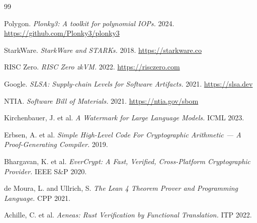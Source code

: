 \documentclass[11pt,a4paper]{article}
\begin{document}

\begin{thebibliography}{99}

 Polygon. \textit{Plonky3: A toolkit for polynomial IOPs.} 2024. \url{https://github.com/Plonky3/plonky3}

 StarkWare. \textit{StarkWare and STARKs.} 2018. \url{https://starkware.co}

 RISC Zero. \textit{RISC Zero zkVM.} 2022. \url{https://risczero.com}

 Google. \textit{SLSA: Supply-chain Levels for Software Artifacts.} 2021. \url{https://slsa.dev}

 NTIA. \textit{Software Bill of Materials.} 2021. \url{https://ntia.gov/sbom}

 Kirchenbauer, J. et al. \textit{A Watermark for Large Language Models.} ICML 2023.

 Erbsen, A. et al. \textit{Simple High-Level Code For Cryptographic Arithmetic --- A Proof-Generating Compiler.} 2019.

 Bhargavan, K. et al. \textit{EverCrypt: A Fast, Verified, Cross-Platform Cryptographic Provider.} IEEE S\&P 2020.

 de Moura, L. and Ullrich, S. \textit{The Lean 4 Theorem Prover and Programming Language.} CPP 2021.

 Achille, C. et al. \textit{Aeneas: Rust Verification by Functional Translation.} ITP 2022.

\end{thebibliography}
\end{document}
